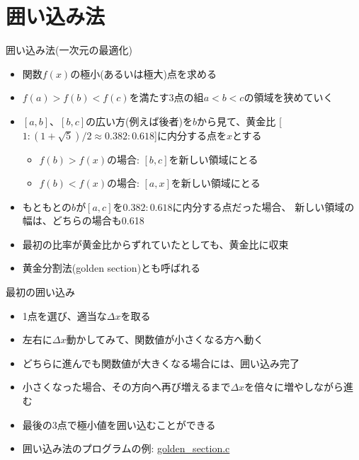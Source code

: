 \section{囲い込み法}

\begin{frame}[t,fragile]{囲い込み法(一次元の最適化)}
  \begin{itemize}
    \setlength{\itemsep}{1em}
  \item 関数$f(x)$の極小(あるいは極大)点を求める
  \item $f(a) > f(b) < f(c)$を満たす3点の組$a < b < c$の領域を狭めていく
  \item $[a,b]$、$[b,c]$の広い方(例えば後者)を$b$から見て、黄金比
    [$1:(1+\sqrt{5})/2 \approx 0.382:0.618$]に内分する点を$x$とする
    \begin{itemize}
    \item $f(b) > f(x)$の場合: $[b,c]$を新しい領域にとる
    \item $f(b) < f(x)$の場合: $[a,x]$を新しい領域にとる
    \end{itemize}
  \item もともとの$b$が$[a,c]$を$0.382:0.618$に内分する点だった場合、
    新しい領域の幅は、どちらの場合も0.618
  \item 最初の比率が黄金比からずれていたとしても、黄金比に収束
  \item 黄金分割法(golden section)とも呼ばれる
  \end{itemize}
\end{frame}

\begin{frame}[t,fragile]{最初の囲い込み}
  \begin{itemize}
    \setlength{\itemsep}{1em}
  \item 1点を選び、適当な$\Delta x$を取る
  \item 左右に$\Delta x$動かしてみて、関数値が小さくなる方へ動く
  \item どちらに進んでも関数値が大きくなる場合には、囲い込み完了
  \item 小さくなった場合、その方向へ再び増えるまで$\Delta x$を倍々に増やしながら進む
  \item 最後の3点で極小値を囲い込むことができる
  \item 囲い込み法のプログラムの例: \href{https://github.com/todo-group/computer-experiments/blob/master/exercise/optimization/golden_section.c}{golden\_section.c}
  \end{itemize}
\end{frame}

